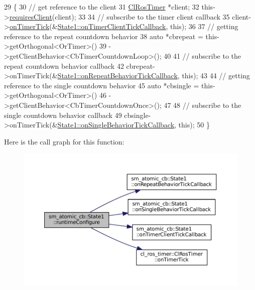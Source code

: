 \begin{DoxyCode}
29     \{
30         \textcolor{comment}{// get reference to the client}
31         \hyperlink{classcl__ros__timer_1_1ClRosTimer}{ClRosTimer} *client;
32         this->\hyperlink{classsmacc_1_1ISmaccState_a7f95c9f0a6ea2d6f18d1aec0519de4ac}{requiresClient}(client);
33 
34         \textcolor{comment}{// subscribe to the timer client callback}
35         client->\hyperlink{classcl__ros__timer_1_1ClRosTimer_a7edcc057bfb5a25fe0892755137dd8da}{onTimerTick}(&\hyperlink{structsm__atomic__cb_1_1State1_a1e1f3cc8c74bc13e28ce47f133c2cecb}{State1::onTimerClientTickCallback},
       \textcolor{keyword}{this});
36 
37         \textcolor{comment}{// getting reference to the repeat countdown behavior}
38         \textcolor{keyword}{auto} *cbrepeat = this->getOrthogonal<OrTimer>()
39                              ->getClientBehavior<CbTimerCountdownLoop>();
40 
41         \textcolor{comment}{// subscribe to the repeat countdown behavior callback}
42         cbrepeat->onTimerTick(&\hyperlink{structsm__atomic__cb_1_1State1_adeb0be6eca06949e0bbb254bff5945bc}{State1::onRepeatBehaviorTickCallback}, \textcolor{keyword}{
      this});
43 
44         \textcolor{comment}{// getting reference to the single countdown behavior}
45         \textcolor{keyword}{auto} *cbsingle = this->getOrthogonal<OrTimer>()
46                              ->getClientBehavior<CbTimerCountdownOnce>();
47 
48         \textcolor{comment}{// subscribe to the single countdown behavior callback}
49         cbsingle->onTimerTick(&\hyperlink{structsm__atomic__cb_1_1State1_a5c34a516ff618f865f668d7db05b2cb8}{State1::onSingleBehaviorTickCallback}, \textcolor{keyword}{
      this});
50     \}
\end{DoxyCode}
Here is the call graph for this function\+:
\nopagebreak
\begin{figure}[H]
\begin{center}
\leavevmode
\includegraphics[width=350pt]{structsm__atomic__cb_1_1State1_a72dd5ac4a82271c55f1f3b07870746aa_cgraph}
\end{center}
\end{figure}
\mbox{\label{structsm__atomic__cb_1_1State1_ab1d42c8c076f8672740626b87f3f45c0}} 
